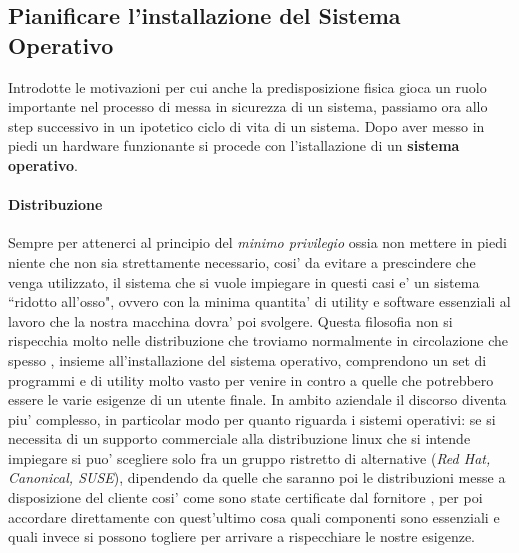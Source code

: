 \subsection{Pianificare l'installazione del Sistema Operativo}
Introdotte le motivazioni per cui anche la predisposizione fisica gioca un ruolo importante nel processo di messa in sicurezza di un sistema, passiamo ora allo step successivo in un ipotetico ciclo di vita di un sistema. Dopo aver messo in piedi un hardware funzionante si procede con l'istallazione di un \textbf{sistema operativo}. 

\paragraph{Distribuzione}
Sempre per attenerci al principio del \emph{minimo privilegio} ossia non mettere in piedi niente che non sia strettamente necessario, cosi' da evitare a prescindere che venga utilizzato, il sistema che si vuole impiegare in questi casi e' un sistema ``ridotto all'osso", ovvero con la minima quantita' di utility e software essenziali al lavoro che la nostra macchina dovra' poi svolgere. Questa filosofia non si rispecchia molto nelle distribuzione che troviamo normalmente in circolazione che spesso , insieme all'installazione del sistema operativo, comprendono un set di programmi e di utility molto vasto per venire in contro a quelle che potrebbero essere le varie esigenze di un utente finale. In ambito aziendale il discorso diventa piu' complesso, in particolar modo per quanto riguarda i sistemi operativi: se si necessita di un supporto commerciale alla distribuzione linux che si intende impiegare si puo' scegliere solo fra un gruppo ristretto di alternative (\emph{Red Hat, Canonical, SUSE}), dipendendo da quelle che saranno poi le distribuzioni messe a disposizione del cliente cosi' come sono state certificate dal fornitore , per poi accordare direttamente con quest'ultimo cosa quali componenti sono essenziali e quali invece si possono togliere per arrivare a rispecchiare le nostre esigenze.

